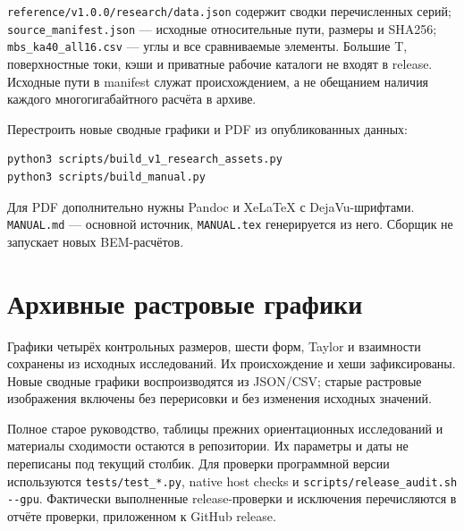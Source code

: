 \documentclass[
  russian,
  11pt,
  a4paper,
]{report}
\begin{document}
\nolinkurl{reference/v1.0.0/research/data.json} содержит сводки
перечисленных серий; \nolinkurl{source_manifest.json} --- исходные
относительные пути, размеры и SHA256; \nolinkurl{mbs_ka40_all16.csv} ---
углы и все сравниваемые элементы. Большие T, поверхностные токи, кэши и
приватные рабочие каталоги не входят в release. Исходные пути в manifest
служат происхождением, а не обещанием наличия каждого многогигабайтного
расчёта в архиве.

Перестроить новые сводные графики и PDF из опубликованных данных:

\begin{verbatim}
python3 scripts/build_v1_research_assets.py
python3 scripts/build_manual.py
\end{verbatim}

Для PDF дополнительно нужны Pandoc и XeLaTeX с DejaVu-шрифтами.
\nolinkurl{MANUAL.md} --- основной источник, \nolinkurl{MANUAL.tex}
генерируется из него. Сборщик не запускает новых BEM-расчётов.

\section{Архивные растровые
графики}\label{ux430ux440ux445ux438ux432ux43dux44bux435-ux440ux430ux441ux442ux440ux43eux432ux44bux435-ux433ux440ux430ux444ux438ux43aux438}

Графики четырёх контрольных размеров, шести форм, Taylor и взаимности
сохранены из исходных исследований. Их происхождение и хеши
зафиксированы. Новые сводные графики воспроизводятся из JSON/CSV; старые
растровые изображения включены без перерисовки и без изменения исходных
значений.

Полное старое руководство, таблицы прежних ориентационных исследований и
материалы сходимости остаются в репозитории. Их параметры и даты не
переписаны под текущий столбик. Для проверки программной версии
используются \nolinkurl{tests/test_*.py}, native host checks и
\nolinkurl{scripts/release_audit.sh --gpu}. Фактически выполненные
release-проверки и исключения перечисляются в отчёте проверки,
приложенном к GitHub release.
\end{document}
